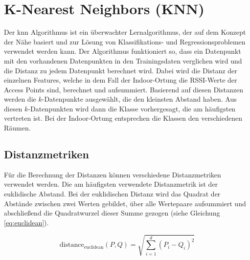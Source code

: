 \section{K-Nearest Neighbors (KNN)}



Der \gls{knn} Algorithmus ist ein überwachter Lernalgorithmus, der auf dem Konzept der Nähe basiert und zur Lösung von Klassifikations- und Regressionsproblemen verwendet werden kann. Der Algorithmus funktioniert so, dass ein Datenpunkt mit den vorhandenen Datenpunkten in den Trainingsdaten verglichen wird und die Distanz zu jedem Datenpunkt berechnet wird. Dabei wird die Distanz der einzelnen Features, welche in dem Fall der Indoor-Ortung die RSSI-Werte der Access Points sind, berechnet und aufsummiert. Basierend auf diesen Distanzen werden die \( k \)-Datenpunkte ausgewählt, die den kleinsten Abstand haben. Aus diesen \( k \)-Datenpunkten wird dann die Klasse vorhergesagt, die am häufigsten vertreten ist. Bei der Indoor-Ortung entsprechen die Klassen den verschiedenen Räumen.

\subsection{Distanzmetriken}
Für die Berechnung der Distanzen können verschiedene Distanzmetriken verwendet werden. Die am häufigsten verwendete Distanzmetrik ist der euklidische Abstand. Bei der euklidischen Distanz wird das Quadrat der Abstände zwischen zwei Werten gebildet, über alle Wertepaare aufsummiert und abschließend die Quadratwurzel dieser Summe gezogen (siehe Gleichung \ref{eq:euclidean}).

\begin{equation}
    \label{eq:euclidean}
    \text{distance}_{\text{euclidean}}(P, Q) = \sqrt{\sum_{i=1}^{d} (P_i - Q_i)^2}
\end{equation}

